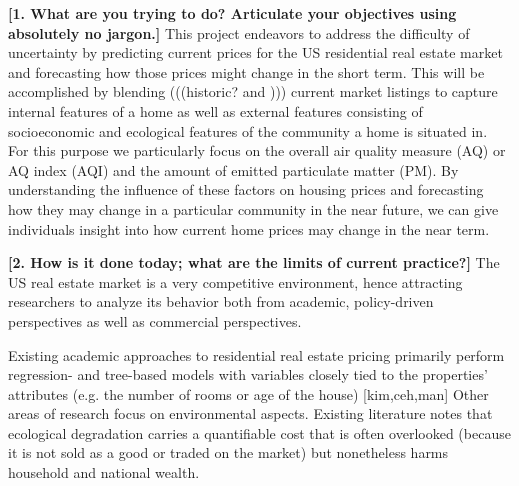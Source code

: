 \documentclass[sigconf,nonacm,11pt]{acmart}
\begin{document}
\textbf{[1. What are you trying to do? Articulate your objectives using absolutely no jargon.]}
This project endeavors to address the difficulty of uncertainty by predicting current prices for the US residential real estate market and forecasting how those prices might change in the short term. This will be accomplished by blending (((historic? and ))) current market listings to capture internal features of a home as well as external features consisting of socioeconomic and ecological features of the community a home is situated in. For this purpose we particularly focus on the overall air quality measure (AQ) or AQ index (AQI) and the amount of emitted particulate matter (PM). By understanding the influence of these factors on housing prices and forecasting how they may change in a particular community in the near future, we can give individuals insight into how current home prices may change in the near term.

\textbf{[2. How is it done today; what are the limits of current practice?]}
The US real estate market is a very competitive environment, hence attracting researchers to analyze its behavior both from academic, policy-driven perspectives as well as commercial perspectives. 

Existing academic approaches to residential real estate pricing primarily perform regression- and tree-based models with variables closely tied to the properties' attributes (e.g. the number of rooms or age of the house) \cite{Kim2003} \cite{Ceh2018} \cite{Manjuna2017}[kim,ceh,man] Other areas of research focus on environmental aspects. Existing literature notes that ecological degradation carries a quantifiable cost that is often overlooked (because it is not sold as a good or traded on the market) but nonetheless harms household and national wealth.
\end{document}
